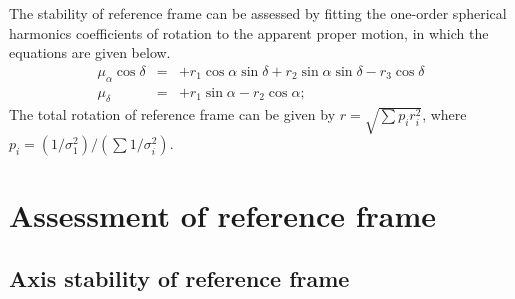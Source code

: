 \documentclass{aa}
\begin{document}


%      

The stability of reference frame can be assessed by fitting the one-order spherical harmonics coefficients of rotation to the apparent proper motion, in which the equations are given below.
\begin{eqnarray}
      \mu_{\alpha}\cos\delta & = 
                                & +r_1\cos\alpha\sin\delta +r_2\sin\alpha\sin\delta -r_3\cos\delta \\
      \mu_{\delta}           & = 
      						    & +r_1\sin\alpha - r_2\cos\alpha;
   \end{eqnarray}
The total rotation of reference frame can be given by $r = \sqrt{\sum p_ir_i^2 }$, where $p_i = (1/\sigma_{1}^2)/(\sum 1/\sigma_{i}^2)$. 


\section{Assessment of reference frame}
\subsection{Axis stability of reference frame}

%
\end{document}
